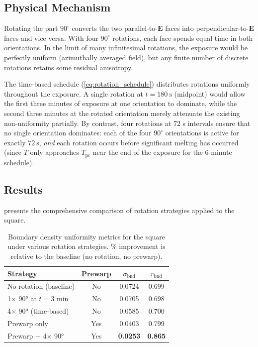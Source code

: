 \documentclass[10pt,twocolumn]{article}
\newcommand{\bndstd}{\sigma_{\mathrm{bnd}}}
\newcommand{\Tpc}{T_{\mathrm{pc}}}
\newcommand{\vect}[1]{\boldsymbol{#1}}
\begin{document}
\subsection{Physical Mechanism}

Rotating the part $90^\circ$ converts the two parallel-to-$\vect{E}$
faces into perpendicular-to-$\vect{E}$ faces and vice versa.  With
four $90^\circ$ rotations, each face spends equal time in both
orientations.  In the limit of many infinitesimal rotations, the
exposure would be perfectly uniform (azimuthally averaged field), but
any finite number of discrete rotations retains some residual anisotropy.

The time-based schedule (\cref{eq:rotation_schedule}) distributes
rotations uniformly throughout the exposure.  A single rotation at
$t = \SI{180}{\second}$ (midpoint) would allow the first three minutes
of exposure at one orientation to dominate, while the second three
minutes at the rotated orientation merely attenuate the existing
non-uniformity partially.  By contrast, four rotations at 72 s
intervals ensure that no single orientation dominates: each of the
four $90^\circ$ orientations is active for exactly $\SI{72}{\second}$,
\textit{and} each rotation occurs before significant melting has
occurred (since $T$ only approaches $\Tpc$ near the end of the
exposure for the 6-minute schedule).

\subsection{Results}

 presents the comprehensive comparison
of rotation strategies applied to the square.

\begin{table}[tb]
\centering
\caption{Boundary density uniformity metrics for the square under
         various rotation strategies.  \% improvement is relative to
         the baseline (no rotation, no prewarp).}
\label{tab:turntable_comparison}
\begin{tabular}{lcSS}
\toprule
Strategy & Prewarp & {$\bndstd$} & {$r_{\mathrm{bnd}}$} \\
\midrule
No rotation (baseline) & No  & 0.0724 & 0.699 \\
1$\times$ 90° at $t=3$ min & No  & 0.0705 & 0.698 \\
4$\times$ 90° (time-based) & No  & 0.0585 & 0.700 \\
Prewarp only            & Yes & 0.0403 & 0.799 \\
Prewarp + 4$\times$ 90° & Yes & \textbf{0.0253} & \textbf{0.865} \\
\bottomrule
\end{tabular}
\end{table}
\end{document}
